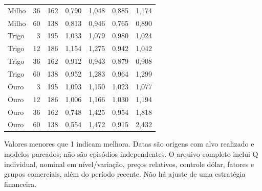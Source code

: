 \documentclass[11pt,a4paper]{article}
\begin{document}
\begin{center}
\begin{tabular}{lrrrrrr}
Milho & 36 & 162 & 0,790 & 1,048 & 0,885 & 1,174 \\
Milho & 60 & 138 & 0,813 & 0,946 & 0,765 & 0,890 \\
Trigo & 3 & 195 & 1,033 & 1,079 & 0,980 & 1,024 \\
Trigo & 12 & 186 & 1,154 & 1,275 & 0,942 & 1,042 \\
Trigo & 36 & 162 & 0,912 & 0,943 & 0,879 & 0,908 \\
Trigo & 60 & 138 & 0,952 & 1,283 & 0,964 & 1,299 \\
Ouro & 3 & 195 & 1,093 & 1,150 & 1,023 & 1,077 \\
Ouro & 12 & 186 & 1,006 & 1,166 & 1,030 & 1,194 \\
Ouro & 36 & 162 & 0,748 & 1,425 & 0,954 & 1,818 \\
Ouro & 60 & 138 & 0,554 & 1,472 & 0,915 & 2,432 \\
\bottomrule\end{tabular}\end{center}\normalsize

Valores menores que 1 indicam melhora. Datas são origens com alvo realizado e modelos pareados; não são episódios independentes. O arquivo completo inclui Q individual, nominal em nível/variação, preços relativos, controle dólar, fatores e grupos comerciais, além do período recente. Não há ajuste de uma estratégia financeira.

\clearpage
\end{document}
